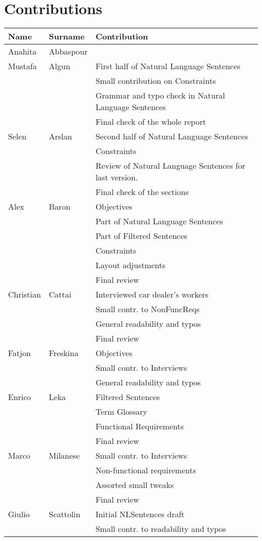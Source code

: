 \newpage
\section{Contributions}

\begin{longtable}{|p{}|p{}|p{}|}
	\hline
	\textbf{Name} & \textbf{Surname} & \textbf{Contribution} \\
	\hline \hline
	Anahita & Abbaspour & \\
	\hline
	Mustafa & Algun & First half of Natural Language Sentences\\
	& & Small contribution on Constraints \\
	& & Grammar and typo check in Natural Language Sentences \\
	& & Final check of the whole report\\
	\hline
	Selen & Arslan & Second half of Natural Language Sentences\\
	& & Constraints \\
	& & Review of Natural Language Sentences for last version. \\
	& & Final check of the sections\\
	\hline
	Alex & Baron & Objectives \\ 
	& & Part of Natural Language Sentences \\
	& & Part of Filtered Sentences \\
	& & Constraints \\
	& & Layout adjustments \\
	& & Final review \\
	\hline
	Christian & Cattai & Interviewed car dealer's workers \\
	& & Small contr. to NonFuncReqs  \\
	& & General readability and typos \\
	& & Final review \\
	\hline
	Fatjon & Freskina & Objectives \\ 
	& & Small contr. to Interviews \\ 
	& & General readability and typos \\
	\hline
	Enrico & Leka & Filtered Sentences \\ 
	& & Term Glossary \\ 
	& & Functional Requirements \\ 
	& & Final review \\
	\hline
	Marco & Milanese & Small contr. to Interviews \\
	& & Non-functional requirements \\
	& & Assorted small tweaks \\
	& & Final review \\
	\hline
	Giulio
	& Scattolin
	& Initial NLSentences draft  \\
	& & Small contr. to readability and typos \\
	\hline

\end{longtable}